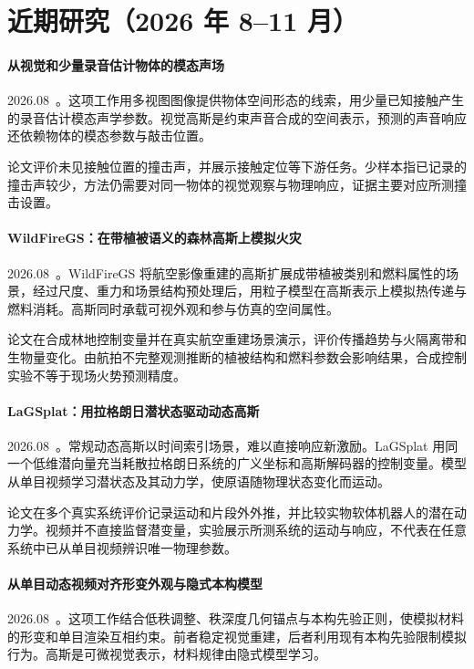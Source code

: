 \section{近期研究（2026 年 8--11 月）}
\paragraph{从视觉和少量录音估计物体的模态声场}
2026.08~\cite{2608_05145}。这项工作用多视图图像提供物体空间形态的线索，用少量已知接触产生的录音估计模态声学参数。视觉高斯是约束声音合成的空间表示，预测的声音响应还依赖物体的模态参数与敲击位置。

论文评价未见接触位置的撞击声，并展示接触定位等下游任务。少样本指已记录的撞击声较少，方法仍需要对同一物体的视觉观察与物理响应，证据主要对应所测撞击设置。

\paragraph{WildFireGS：在带植被语义的森林高斯上模拟火灾}
2026.08~\cite{2608_11100}。WildFireGS 将航空影像重建的高斯扩展成带植被类别和燃料属性的场景，经过尺度、重力和场景结构预处理后，用粒子模型在高斯表示上模拟热传递与燃料消耗。高斯同时承载可视外观和参与仿真的空间属性。

论文在合成林地控制变量并在真实航空重建场景演示，评价传播趋势与火隔离带和生物量变化。由航拍不完整观测推断的植被结构和燃料参数会影响结果，合成控制实验不等于现场火势预测精度。

\paragraph{LaGSplat：用拉格朗日潜状态驱动动态高斯}
2026.08~\cite{2608_16324}。常规动态高斯以时间索引场景，难以直接响应新激励。LaGSplat 用同一个低维潜向量充当耗散拉格朗日系统的广义坐标和高斯解码器的控制变量。模型从单目视频学习潜状态及其动力学，使原语随物理状态变化而运动。

论文在多个真实系统评价记录运动和片段外外推，并比较实物软体机器人的潜在动力学。视频并不直接监督潜变量，实验展示所测系统的运动与响应，不代表在任意系统中已从单目视频辨识唯一物理参数。

\paragraph{从单目动态视频对齐形变外观与隐式本构模型}
2026.08~\cite{2608_22102}。这项工作结合低秩调整、秩深度几何锚点与本构先验正则，使模拟材料的形变和单目渲染互相约束。前者稳定视觉重建，后者利用现有本构先验限制模拟行为。高斯是可微视觉表示，材料规律由隐式模型学习。

